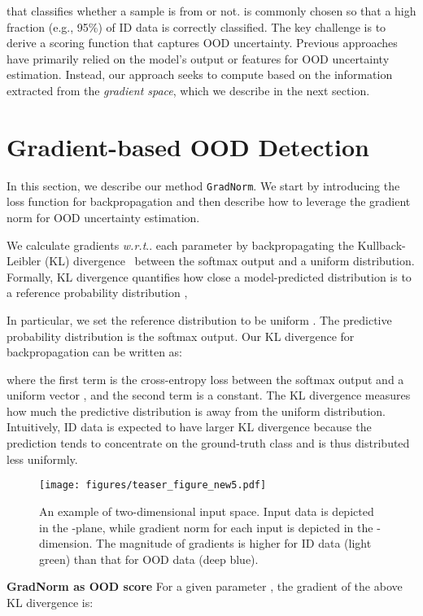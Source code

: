 \documentclass{article}
\makeatletter
\DeclareRobustCommand\onedot{\futurelet\@let@token\@onedot}
\def\@onedot{\ifx\@let@token.\else.\null\fi\xspace}
\def\wrt{\emph{w.r.t}\onedot} \def\dof{d.o.f\onedot}
\makeatother
\begin{document}
that classifies whether a sample  is from  or not.  is commonly chosen so that a high fraction (e.g., 95\%) of ID data is correctly classified. The key challenge is to derive a scoring function  that captures OOD uncertainty. Previous approaches have primarily relied on the model's output or features for OOD uncertainty estimation. Instead, our approach seeks to compute  based on the information extracted from the \emph{gradient space}, which we describe in the next section.




\section{Gradient-based OOD Detection}
\label{sec:method}


In this section, we describe our  method \texttt{GradNorm}. We start by introducing the loss function for backpropagation and then describe how to leverage the gradient norm for OOD uncertainty estimation.










We calculate gradients \wrt each parameter by backpropagating the Kullback-Leibler (KL) divergence~\cite{kullback1951information} between the softmax output and a uniform distribution. Formally, KL divergence quantifies how close a model-predicted distribution  is to a reference probability distribution ,


In particular, we set the reference distribution to be uniform . The predictive probability distribution is the softmax output. Our KL divergence for backpropagation can be written as:
\vspace{-0.2cm}

where the first term is the cross-entropy loss between the softmax output and a uniform vector , and the second term  is a constant. The KL divergence measures how much the predictive distribution is away from the uniform distribution. Intuitively, ID data is expected to have larger KL divergence because the prediction tends to concentrate on the ground-truth class and is thus distributed less uniformly. 



\begin{wrapfigure}{r}{0.45\textwidth}
\vspace{-1cm}
    \texttt{[image: figures/teaser\_figure\_new5.pdf]}
        \vspace{-0.5cm}
    \caption{\small{An example of two-dimensional input space. Input data is depicted in the -plane, while gradient norm for each input is depicted in the -dimension. The magnitude of gradients is higher for ID data ({\color{green}light green}) than that for OOD data ({\color{blue}deep blue}).}}
    \label{fig:teaser}
    \vspace{-1.5cm}
\end{wrapfigure}
\textbf{{GradNorm} as OOD score} For a given parameter , the gradient of the above KL divergence is:
\end{document}
